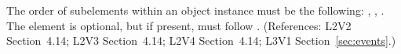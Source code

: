 The order of subelements within an \Event object instance must be
the following: , ,
.  The  element is
optional, but if present, must follow .
(References: L2V2 Section~4.14; L2V3 Section~4.14; L2V4 Section~4.14; 
L3V1 Section~\ref{sec:events}.)

